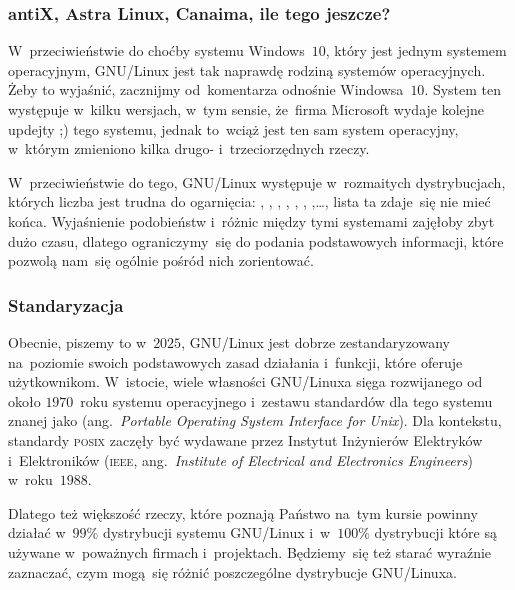 \documentclass[10pt,t]{beamer}
\begin{document}
\begin{frame}
  \frametitle{antiX, Astra Linux, Canaima, ile tego jeszcze?}


  W~przeciwieństwie do choćby systemu Windows~$10$, który jest jednym
  systemem operacyjnym, GNU/Linux jest tak naprawdę \alert{rodziną systemów}
  operacyjnych. Żeby to wyjaśnić, zacznijmy od~komentarza odnośnie
  Windowsa~$10$. System ten występuje w~kilku wersjach, w~tym sensie,
  że~firma Microsoft wydaje kolejne updejty ;) tego systemu, jednak to~wciąż
  jest ten sam system operacyjny, w~którym zmieniono kilka drugo-
  i~trzeciorzędnych rzeczy.

  W~przeciwieństwie do tego, GNU/Linux występuje w~rozmaitych
  \alert{dystrybucjach}, których liczba jest trudna do ogarnięcia:
  ,
  ,
  ,
  ,
  ,
  ,
  ,\ldots, lista ta zdaje~się
  nie mieć końca. Wyjaśnienie podobieństw i~różnic między tymi systemami
  zajęłoby zbyt dużo czasu, dlatego ograniczymy~się do podania
  podstawowych informacji, które pozwolą nam~się ogólnie pośród nich
  zorientować.

\end{frame}





\begin{frame}
  \frametitle{Standaryzacja}


  Obecnie, piszemy to w~$2025$, GNU/Linux jest dobrze zestandaryzowany
  na~poziomie swoich podstawowych zasad działania i~funkcji, które oferuje
  użytkownikom. W~istocie, wiele własności GNU/Linuxa sięga rozwijanego od
  około $1970$~roku systemu operacyjnego
   i~zestawu
  standardów dla tego systemu znanej jako
  (ang.~\textit{Portable Operating System Interface for Unix}). Dla
  kontekstu, standardy \textsc{posix} zaczęły być wydawane przez Instytut
  Inżynierów Elektryków i~Elektroników (\textsc{ieee},
  ang.~\textit{Institute of Electrical and Electronics Engineers})
  w~roku~$1988$.

  Dlatego też większość rzeczy, które poznają Państwo na~tym kursie powinny
  działać w~$99\%$ dystrybucji systemu GNU/Linux i~w~$100\%$ dystrybucji
  które są używane w~poważnych firmach i~projektach. Będziemy~się też
  starać wyraźnie zaznaczać, czym mogą~się różnić poszczególne dystrybucje
  GNU/Linuxa.

\end{frame}
\end{document}
